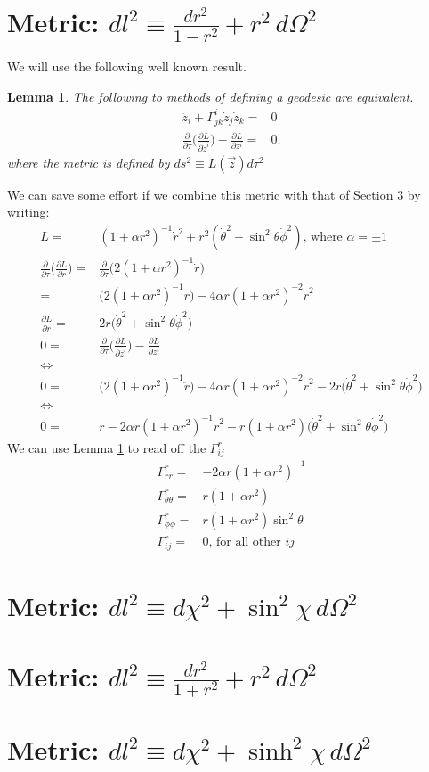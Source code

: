 \documentclass[]{article}
\newtheorem{lemma}{Lemma}
\begin{document}
\section{Metric: $dl^2\equiv\frac{dr^2}{1-r^2}+r^2\,d\Omega^2$}
We will use the following well known result.
\begin{lemma}\label{lemma:geodesic}
	The following to methods of defining a geodesic are equivalent.
	\begin{align*}
	\ddot{z}_i + \Gamma^i_{jk}\dot{z}_j \dot{z}_k =& 0 \\
	\frac{\partial}{\partial \tau}\Big(\frac{\partial L}{\partial \dot{z}^i}\Big)-\frac{\partial L}{\partial z^i}=&0.
	\end{align*}
	where the metric is defined by $ds^2\equiv L(\vec{z}) d\tau^2$ 
\end{lemma}
We can save some effort if we combine this metric with that of Section \ref{section:metric3} by writing:
\begin{align*}
L=&(1+\alpha r^2)^{-1}\dot{r}^2 + r^2(\dot\theta^2 + \sin^2 \theta \dot \phi^2)\text{, where $\alpha=\pm 1$}\\
\frac{\partial}{\partial \tau}\Big(\frac{\partial L}{\partial \dot{r}}\Big)=&\frac{\partial}{\partial \tau}\Big(2(1+\alpha r^2)^{-1}\dot r\Big)\\
=& \Big(2(1+\alpha r^2)^{-1}\ddot r\Big)-4 \alpha r (1+\alpha r^2)^{-2}\dot{r}^2\\
\frac{\partial L}{\partial r}=&2r\big(\dot{\theta}^2 + \sin^2 \theta \dot \phi ^2\big)\\
0=&\frac{\partial}{\partial \tau}\Big(\frac{\partial L}{\partial \dot{z}^i}\Big)-\frac{\partial L}{\partial z^i}\\
\iff&\\
0=&	\Big(2(1+\alpha r^2)^{-1}\ddot r\Big)-4 \alpha r (1+\alpha r^2)^{-2}\dot{r}^2-2r\big(\dot{\theta}^2 + \sin^2 \theta \dot \phi ^2\big)\\
\iff&\\
0=&\ddot r-2 \alpha r (1+\alpha r^2)^{-1}\dot{r}^2-r(1+\alpha r^2)\big(\dot{\theta}^2 + \sin^2 \theta \dot \phi ^2\big)
\end{align*}
We can use Lemma \ref{lemma:geodesic} to read off the $\Gamma^r_{ij}$
\begin{align*}
\Gamma^r_{rr}=&-2 \alpha r (1+\alpha r^2)^{-1}\\
\Gamma^r_{\theta\theta}=&r(1+\alpha r^2)\\
\Gamma^r_{\phi\phi}=&r(1+\alpha r^2)\sin^2 \theta\\
\Gamma^r_{ij}=& 0\text{, for all other $ij$}
\end{align*}
\section{Metric: $dl^2\equiv d\chi^2+\sin^2 \chi\,d\Omega^2$}
\section{Metric: $dl^2\equiv\frac{dr^2}{1+r^2}+r^2\,d\Omega^2$}  \label{section:metric3}
\section{Metric: $dl^2\equiv d\chi^2+\sinh^2 \chi\,d\Omega^2$}
\end{document}
